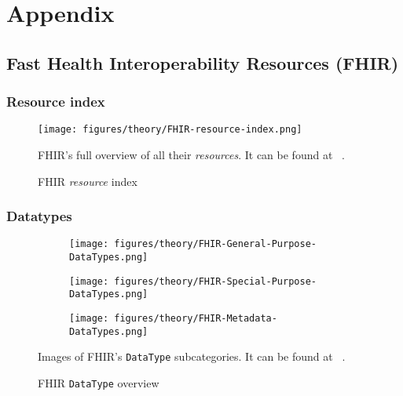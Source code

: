 \section{Appendix}

\subsection{Fast Health Interoperability Resources (FHIR)}

\subsubsection{Resource index}
\begin{figure}[H]
    \centering
    \texttt{[image: figures/theory/FHIR-resource-index.png]}
    \caption{FHIR \emph{resource} index}
    \medskip
    \small
    \raggedright
    FHIR's full overview of all their \emph{resources}. It can be found at ~\cite{FHIR-resource-index}.
    \label{fig:FHIR-resource-index}
\end{figure}

\subsubsection{Datatypes}
\begin{figure}[H]
    \centering
    \begin{subfigure}[t]{0.7\textwidth}
        \centering
        \texttt{[image: figures/theory/FHIR-General-Purpose-DataTypes.png]}
    \end{subfigure}
    \vfill
    \begin{subfigure}[t]{0.7\textwidth}
        \centering
        \texttt{[image: figures/theory/FHIR-Special-Purpose-DataTypes.png]}
    \end{subfigure}
    \vfill
    \begin{subfigure}[t]{0.7\textwidth}
        \centering
        \texttt{[image: figures/theory/FHIR-Metadata-DataTypes.png]}
    \end{subfigure}
    \caption{FHIR \texttt{DataType} overview}
    \medskip
    \small
    \raggedright
    Images of FHIR's \texttt{DataType} subcategories. It can be found at ~\cite{FHIR-data-types-overview}.
    \label{fig:FHIR-data-types-overview}
\end{figure}

